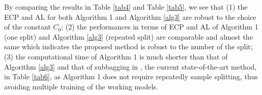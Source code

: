 \documentclass[11pt]{article}
\theoremstyle{referenceplain}
\theoremstyle{referencedefinition}
\theoremstyle{referenceremark}
\begin{document}
By comparing the results in Table \ref{tab4} and Table \ref{tab5}, we see that (1) the ECP and AL for both Algorithm 1 and Algorithm \ref{alg3} are robust to the choice of the constant ${C_0}$; (2) the performances in terms of ECP and AL of Algorithm 1 (one split) and Algorithm \ref{alg3} (repeated split) are comparable and almost the same which indicates the proposed method is robust to the number of the split; (3) the computational time of Algorithm 1 is much shorter than that of Algorithm \ref{alg3} and that of subbagging in \citet{shi2020breaking}, the current state-of-the-art method,  in Table \ref{tab6}, as Algorithm 1 does not require repeatedly sample splitting, thus avoiding multiple training of the working models. 
\setcounter{table}{3}
\end{document}
